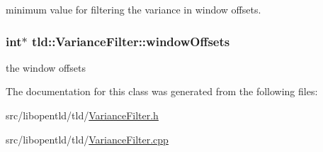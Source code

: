 minimum value for filtering the variance in window offsets. 

\hypertarget{classtld_1_1VarianceFilter_a2c8913adc5862adf9eb3034b81c1f02b}{
\subsubsection[{window\-Offsets}]{\setlength{\rightskip}{0pt plus 5cm}int$\ast$ tld\-::\-Variance\-Filter\-::window\-Offsets}}\label{classtld_1_1VarianceFilter_a2c8913adc5862adf9eb3034b81c1f02b}


the window offsets 



The documentation for this class was generated from the following files\-:\begin{DoxyCompactItemize}
\item 
src/libopentld/tld/\hyperlink{VarianceFilter_8h}{Variance\-Filter.\-h}\item 
src/libopentld/tld/\hyperlink{VarianceFilter_8cpp}{Variance\-Filter.\-cpp}\end{DoxyCompactItemize}
